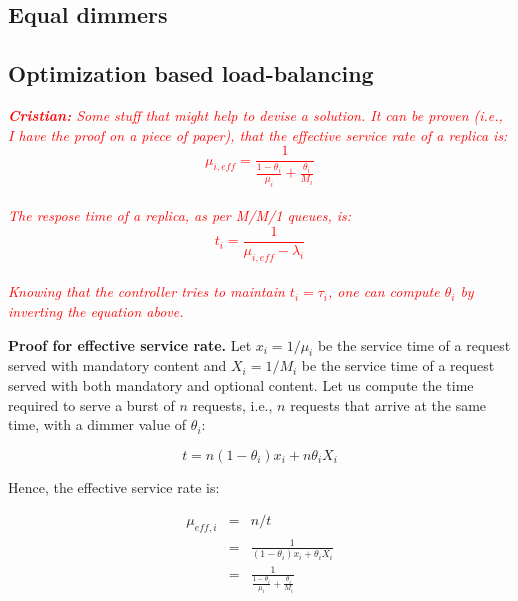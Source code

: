 \subsection{Equal dimmers}

\subsection{Optimization based load-balancing}

\textcolor{red}{\textit{\textbf{Cristian:} Some stuff that might help
    to devise a solution. It can be proven (i.e., I have the proof on
    a piece of paper), that the effective service rate of a replica
    is: $$\mu_{i,eff}=\frac{1}{\frac{1-\theta_i}{\mu_i}+\frac{\theta_i}{M_i}}$$
    \\
    The respose time of a replica, as per M/M/1 queues, is:
    \\
    $$t_i=\frac{1}{\mu_{i,eff}-\lambda_i}$$
    \\
    Knowing that the controller tries to maintain $t_i=\tau_i$, one
    can compute $\theta_i$ by inverting the equation above.
}}
	
\textbf{Proof for effective service rate.} Let $x_i = 1/\mu_i$ be the service time of a request served with mandatory content and $X_i = 1/M_i$ be the service time of a request served with both mandatory and optional content. Let us compute the time required to serve a burst of $n$ requests, i.e., $n$ requests that arrive at the same time, with a dimmer value of $\theta_i$:

$$t=n (1-\theta_i) x_i + n \theta_i X_i$$

Hence, the effective service rate is:

\begin{eqnarray*}
\mu_{eff,i} & = & n/t \\
& = & \frac{1}{(1-\theta_i) x_i + \theta_i X_i} \\
& = & \frac{1}{\frac{1-\theta_i}{\mu_i} + \frac{\theta_i}{M_i}}
\end{eqnarray*}

